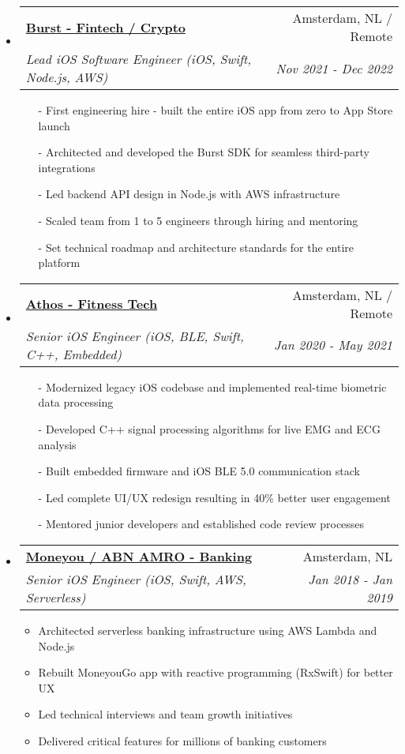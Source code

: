\documentclass[letterpaper,11pt]{article}
\makeatletter
\newcommand{\resitem}[1]{\item #1 \vspace{-2pt}}
\newcommand{\ressubheading}[4]{
\begin{tabular*}{7.0in}{l@{\extracolsep{\fill}}r}
    \textbf{#1} & #2 \\
    \textit{#3} & \textit{#4} \\
\end{tabular*}\vspace{-6pt}}
\makeatother
\begin{document}
\begin{itemize}
\item
    \ressubheading{\href{https://www.joinburst.com}{Burst - Fintech / Crypto}}{Amsterdam, NL / Remote}{Lead iOS Software Engineer (iOS, Swift, Node.js, AWS)}{Nov 2021 - Dec 2022}
    \begin{itemize}
        \item[-]{First engineering hire - built the entire iOS app from zero to App Store launch}
        \item[-]{Architected and developed the Burst SDK for seamless third-party integrations}
        \item[-]{Led backend API design in Node.js with AWS infrastructure}
        \item[-]{Scaled team from 1 to 5 engineers through hiring and mentoring}
        \item[-]{Set technical roadmap and architecture standards for the entire platform}
    \end{itemize}

\item
    \ressubheading{\href{https://www.crunchbase.com/organization/athos}{Athos - Fitness Tech}}{Amsterdam, NL / Remote}{Senior iOS Engineer (iOS, BLE, Swift, C++, Embedded)}{Jan 2020 - May 2021}
    \begin{itemize}
        \item[-]{Modernized legacy iOS codebase and implemented real-time biometric data processing}
        \item[-]{Developed C++ signal processing algorithms for live EMG and ECG analysis}
        \item[-]{Built embedded firmware and iOS BLE 5.0 communication stack}
        \item[-]{Led complete UI/UX redesign resulting in 40\% better user engagement}
        \item[-]{Mentored junior developers and established code review processes}
    \end{itemize}
    
\item
    \ressubheading{\href{https://www.moneyou.nl/}{Moneyou / ABN AMRO - Banking}}{Amsterdam, NL}{Senior iOS Engineer (iOS, Swift, AWS, Serverless)}{Jan 2018 - Jan 2019}
    \begin{itemize}
        \resitem{Architected serverless banking infrastructure using AWS Lambda and Node.js}
        \resitem{Rebuilt MoneyouGo app with reactive programming (RxSwift) for better UX}
        \resitem{Led technical interviews and team growth initiatives}
        \resitem{Delivered critical features for millions of banking customers}
    \end{itemize}
        

\end{itemize}
\end{document}
